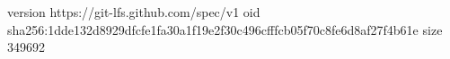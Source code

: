 version https://git-lfs.github.com/spec/v1
oid sha256:1dde132d8929dfcfe1fa30a1f19e2f30c496cfffcb05f70c8fe6d8af27f4b61e
size 349692
